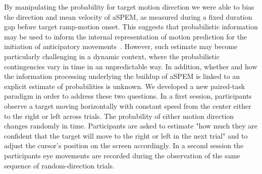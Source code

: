\documentclass[profile,final,english, draft]{article}%
\newcommand{\citep}[1]{(\cite{#1})}
\begin{document}

By manipulating the probability for target motion direction we were able to bias the direction and mean velocity of aSPEM, as measured during a fixed duration gap before target ramp-motion onset. This suggests that probabilistic information may be used to inform the internal representation of motion prediction for the initiation of anticipatory movements~\parencite{Montagnini2010}. However, such estimate may become particularly challenging in a dynamic context, where the probabilistic contingencies vary in time in an unpredictable way. In addition, whether and how the information processing underlying the buildup of aSPEM is linked to an explicit estimate of probabilities is unknown. We developed a new paired-task paradigm in order to address these two questions. In a first session, participants observe a target moving horizontally with constant speed from the center either to the right or left across trials. The probability of either motion direction changes randomly in time. Participants are asked to estimate "how much they are confident that the target will move to the right or left in the next trial" and to adjust the cursor's position on the screen accordingly. In a second session the participants eye movements are recorded during the observation of the same sequence of random-direction trials.
\end{document}
